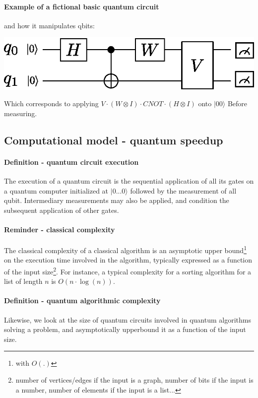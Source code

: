 \documentclass{article}
\begin{document}
\paragraph{Example of a fictional basic quantum circuit} and how it manipulates
qbits:
\begin{center}
\includegraphics[width=.6\textwidth]{quantum_circuit_example.eps}
\end{center}

    Which corresponds to applying $V\cdot (W\otimes I) \cdot CNOT  \cdot (H\otimes I) $ onto 
    $|00\rangle$ Before measuring.

\subsection{Computational model - quantum speedup}

\paragraph{Definition - quantum circuit execution} The execution of a quantum circuit is the
sequential application of all its gates on a quantum computer
initialized at $|0...0\rangle$ followed by the measurement of all qubit.
Intermediary measurements may also be applied, and condition the subsequent application
of other gates. 

\paragraph{Reminder - classical complexity} The classical complexity of
    a classical algorithm is an asymptotic upper bound\footnote{with $O(.)$} on the execution time
involved in the algorithm, typically expressed
as a function of the input size\footnote{number of vertices/edges if the input is a graph, 
number of bits if the input is a number, number of elements if the input is a list...}.
For instance, a typical complexity for a sorting algorithm for a list of length $n$
is $O(n\cdot \log(n))$.

\paragraph{Definition - quantum algorithmic complexity} Likewise, we look at the size of 
quantum circuits involved in quantum algorithms solving a problem, 
and asymptotically upperbound it as a function of the input size.
\end{document}
